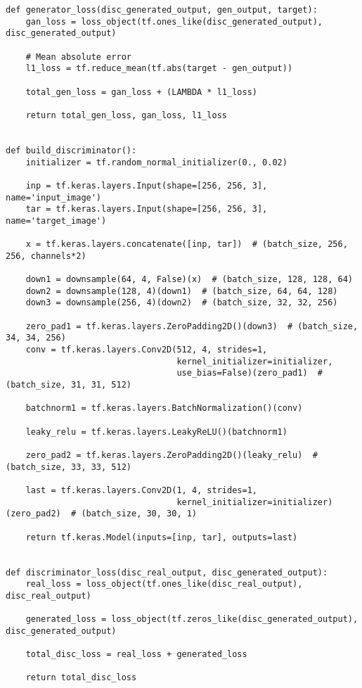 \begin{lstlisting}
def generator_loss(disc_generated_output, gen_output, target):
    gan_loss = loss_object(tf.ones_like(disc_generated_output), disc_generated_output)

    # Mean absolute error
    l1_loss = tf.reduce_mean(tf.abs(target - gen_output))

    total_gen_loss = gan_loss + (LAMBDA * l1_loss)

    return total_gen_loss, gan_loss, l1_loss


def build_discriminator():
    initializer = tf.random_normal_initializer(0., 0.02)

    inp = tf.keras.layers.Input(shape=[256, 256, 3], name='input_image')
    tar = tf.keras.layers.Input(shape=[256, 256, 3], name='target_image')

    x = tf.keras.layers.concatenate([inp, tar])  # (batch_size, 256, 256, channels*2)

    down1 = downsample(64, 4, False)(x)  # (batch_size, 128, 128, 64)
    down2 = downsample(128, 4)(down1)  # (batch_size, 64, 64, 128)
    down3 = downsample(256, 4)(down2)  # (batch_size, 32, 32, 256)

    zero_pad1 = tf.keras.layers.ZeroPadding2D()(down3)  # (batch_size, 34, 34, 256)
    conv = tf.keras.layers.Conv2D(512, 4, strides=1,
                                  kernel_initializer=initializer,
                                  use_bias=False)(zero_pad1)  # (batch_size, 31, 31, 512)

    batchnorm1 = tf.keras.layers.BatchNormalization()(conv)

    leaky_relu = tf.keras.layers.LeakyReLU()(batchnorm1)

    zero_pad2 = tf.keras.layers.ZeroPadding2D()(leaky_relu)  # (batch_size, 33, 33, 512)

    last = tf.keras.layers.Conv2D(1, 4, strides=1,
                                  kernel_initializer=initializer)(zero_pad2)  # (batch_size, 30, 30, 1)

    return tf.keras.Model(inputs=[inp, tar], outputs=last)


def discriminator_loss(disc_real_output, disc_generated_output):
    real_loss = loss_object(tf.ones_like(disc_real_output), disc_real_output)

    generated_loss = loss_object(tf.zeros_like(disc_generated_output), disc_generated_output)

    total_disc_loss = real_loss + generated_loss

    return total_disc_loss



\end{lstlisting}
